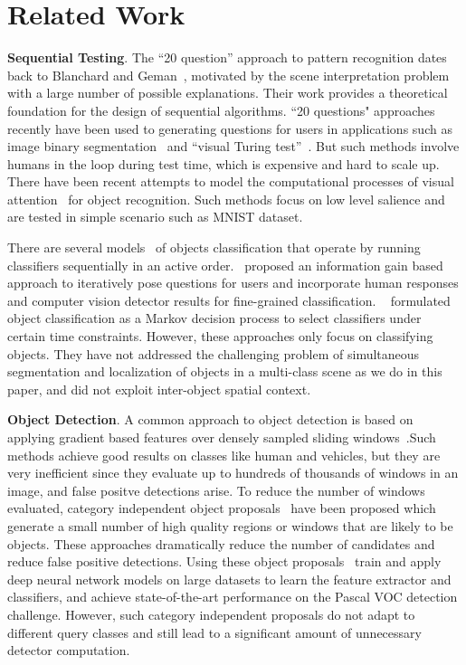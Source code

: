 \section{Related Work}
\label{sec:relatedwork}

{\bf{Sequential Testing}}. 
The ``20 question'' approach to pattern recognition dates back to Blanchard and Geman~\cite{blanchard2005hierarchical}, motivated by the scene interpretation problem with a large number of possible explanations. Their work provides a theoretical foundation for the design of sequential algorithms. ``20 questions" approaches recently have been used to generating questions for users in applications such as image binary segmentation~\cite{rupprecht2015image} and ``visual Turing test''~\cite{geman2015visual}. But such methods involve humans in the loop during test time, which is expensive and hard to scale up.  There have been recent attempts to model the computational processes of visual attention~\cite{ranzato2014learning, larochelle2010learning} for object recognition. Such methods focus on low level salience and are tested in simple scenario such as MNIST dataset. 

There are several models~\cite{gao2011active} of objects classification that operate by running classifiers sequentially in an active order.~\cite{branson2010visual} proposed an information gain based approach to iteratively pose questions for users and incorporate human responses and computer vision detector results for fine-grained classification.
~\cite{sergey2012timely} formulated object classification as a Markov decision process to select classifiers under certain time constraints. However, these approaches only focus on classifying objects. They have not addressed the challenging problem of simultaneous segmentation and localization of objects in a multi-class scene as we do in this paper, and did not exploit inter-object spatial context.



{\bf Object Detection}. 
A common approach to object detection is based on applying gradient based features over densely sampled sliding windows~\cite{felzenszwalb2010object}.Such methods achieve good results on classes like human and vehicles, but they are very inefficient since they evaluate up to hundreds of thousands of windows in an image, and false positve detections arise. To reduce the number of windows evaluated,  category independent object proposals~\cite{carreira2012cpmc,van2011segmentation,arbelaez2014multiscale} have been proposed which generate a small number of high quality regions or windows that are likely to be objects. These approaches dramatically reduce the number of candidates and reduce false positive detections. Using these object proposals~\cite{girshick14CVPR, BharathECCV2014} train and apply deep neural network models on large datasets to learn the feature extractor and classifiers, and achieve state-of-the-art performance on the Pascal VOC detection challenge. However, such category independent proposals do not adapt to different query classes and still lead to a significant amount of unnecessary detector computation. 

